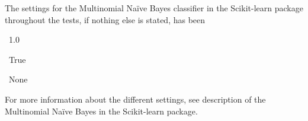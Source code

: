 The settings for the Multinomial Naïve Bayes classifier in the Scikit-learn package throughout the tests, if nothing else is stated, has been
\begin{description}[noitemsep,labelindent=0.5cm]
\small
	\item[Alpha:] \ 1.0
	\item[Fit prior:]\ True
	\item[Class prior:] \ None
\end{description}
For more information about the different settings, see description of the Multinomial Naïve Bayes in the Scikit-learn package.